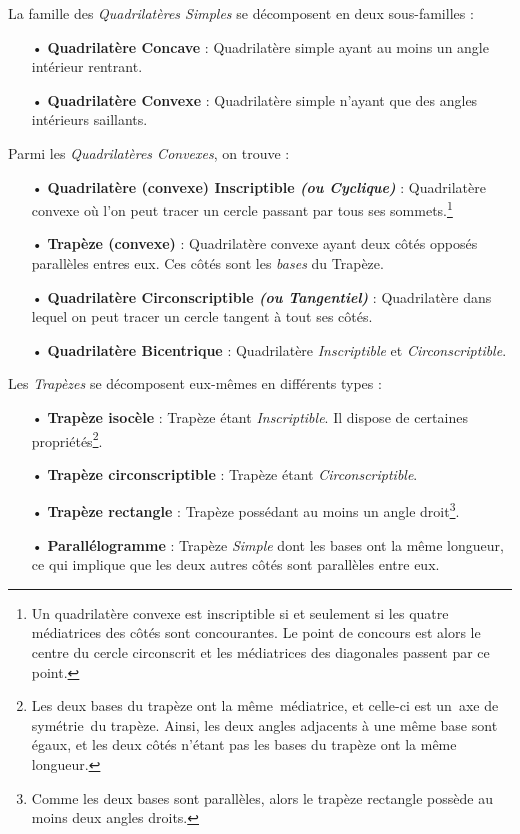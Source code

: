 \documentclass[a4paper, twoside]{article}
\begin{document}
\bigbreak

La famille des \emph{Quadrilatères Simples} se décomposent en deux sous-familles :

\begin{itemize}
	\item[•] \textbf{Quadrilatère Concave} : Quadrilatère simple ayant au moins un angle intérieur rentrant.
	\item[•] \textbf{Quadrilatère Convexe} : Quadrilatère simple n'ayant que des angles intérieurs saillants.
\end{itemize}

\bigbreak

Parmi les \emph{Quadrilatères Convexes}, on trouve :

\begin{itemize}
	\item[•] \textbf{Quadrilatère (convexe) Inscriptible \textit{(ou Cyclique)}} : Quadrilatère convexe où l'on peut tracer un cercle passant par tous ses sommets.\footnote{
		      Un quadrilatère convexe est inscriptible
		      si et seulement si les quatre médiatrices des côtés
		      sont concourantes. Le point de concours est alors le centre
		      du cercle circonscrit et les médiatrices des diagonales
		      passent par ce point.}

	\item[•] \textbf{Trapèze (convexe)} : Quadrilatère convexe ayant deux côtés opposés parallèles entres eux. Ces côtés sont les \emph{bases} du Trapèze.
	\item[•] \textbf{Quadrilatère Circonscriptible \textit{(ou Tangentiel)}} : Quadrilatère dans lequel on peut tracer un cercle tangent à tout ses côtés.
	\item[•] \textbf{Quadrilatère Bicentrique} : Quadrilatère \textit{Inscriptible} et \textit{Circonscriptible}.
\end{itemize}

\bigbreak

Les \emph{Trapèzes} se décomposent eux-mêmes en différents types :

\begin{itemize}
	\item[•] \textbf{Trapèze isocèle} : Trapèze étant \textit{Inscriptible}. Il dispose de certaines propriétés\footnote{
		      Les deux bases du trapèze ont la même médiatrice, et celle-ci est un axe de symétrie du trapèze.
		      Ainsi, les deux angles adjacents à une même base sont égaux,
		      et les deux côtés n'étant pas les bases du trapèze ont la même longueur.
	      }.

	\item[•] \textbf{Trapèze circonscriptible} : Trapèze étant \textit{Circonscriptible}.
	\item[•] \textbf{Trapèze rectangle} : Trapèze possédant au moins un angle droit\footnote{Comme
		      les deux bases sont parallèles,
		      alors le trapèze rectangle possède au moins deux angles droits.}.
	\item[•] \textbf{Parallélogramme} : Trapèze \textit{Simple} dont les bases ont la même longueur,
	      ce qui implique que les deux autres côtés sont parallèles entre eux.
\end{itemize}
\end{document}
